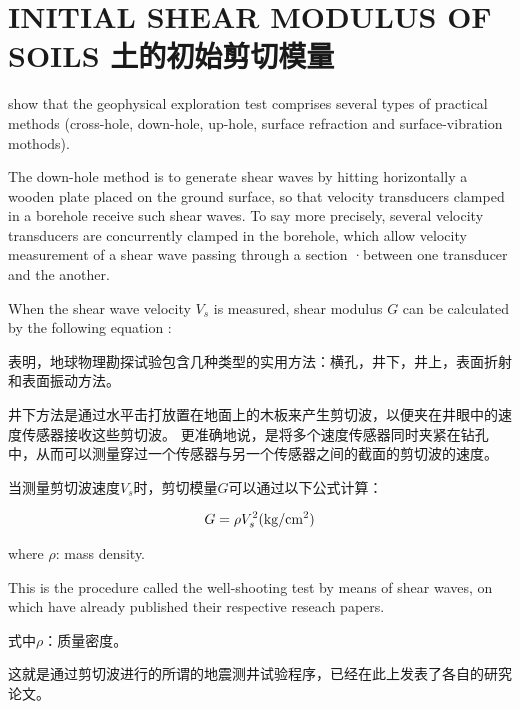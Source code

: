 \section{INITIAL SHEAR MODULUS OF SOILS 土的初始剪切模量}


\begin{paracol}{2}
    
    \citet{Miller1972545}  show that the geophysical exploration test comprises several types of practical methods (cross-hole, down-hole, up-hole, surface refraction and surface-vibration mothods).
    
    The down-hole method is to generate shear waves by hitting horizontally a wooden plate placed on the ground surface, so that velocity transducers clamped in a borehole receive such shear waves. To say more precisely, several velocity transducers are concurrently clamped in the borehole, which allow velocity measurement of a shear wave passing through a section ·between one transducer and the another.
    
    When the shear wave velocity $V_s$ is measured, shear modulus $G$ can be calculated by the following equation :

    \switchcolumn

    \citet{Miller1972545}表明，地球物理勘探试验包含几种类型的实用方法：横孔，井下，井上，表面折射和表面振动方法。
    
    井下方法是通过水平击打放置在地面上的木板来产生剪切波，以便夹在井眼中的速度传感器接收这些剪切波。 更准确地说，是将多个速度传感器同时夹紧在钻孔中，从而可以测量穿过一个传感器与另一个传感器之间的截面的剪切波的速度。
    
    当测量剪切波速度$V_s$时，剪切模量$G$可以通过以下公式计算：

\end{paracol}
    
\begin{align}
    G=\rho{}V_s^2(\rm{kg/cm^2})
    \label{equation:1}
\end{align}

\begin{paracol}{2}
    \noindent where $\rho$: mass density.

    This is the procedure called the well-shooting test by means of shear waves, on which \citet{Kitsunezaki19671,Shima19681301, Shima1969819, Imai197017} have already published their respective reseach papers.

    \switchcolumn

    \noindent 式中$\rho$：质量密度。

    这就是通过剪切波进行的所谓的地震测井试验程序，\citet{Kitsunezaki19671,Shima19681301, Shima1969819, Imai197017}已经在此上发表了各自的研究论文。

\end{paracol}

